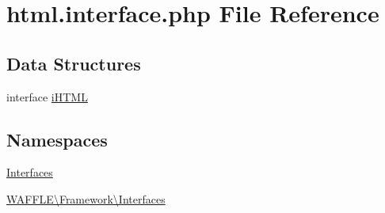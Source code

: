 \hypertarget{html_8interface_8php}{}\section{html.\+interface.\+php File Reference}
\label{html_8interface_8php}
\subsection*{Data Structures}
\begin{DoxyCompactItemize}
\item 
interface \hyperlink{interface_w_a_f_f_l_e_1_1_framework_1_1_interfaces_1_1i_h_t_m_l}{i\+H\+T\+ML}
\end{DoxyCompactItemize}
\subsection*{Namespaces}
\begin{DoxyCompactItemize}
\item 
 \hyperlink{namespace_interfaces}{Interfaces}
\item 
 \hyperlink{namespace_w_a_f_f_l_e_1_1_framework_1_1_interfaces}{W\+A\+F\+F\+L\+E\textbackslash{}\+Framework\textbackslash{}\+Interfaces}
\end{DoxyCompactItemize}
